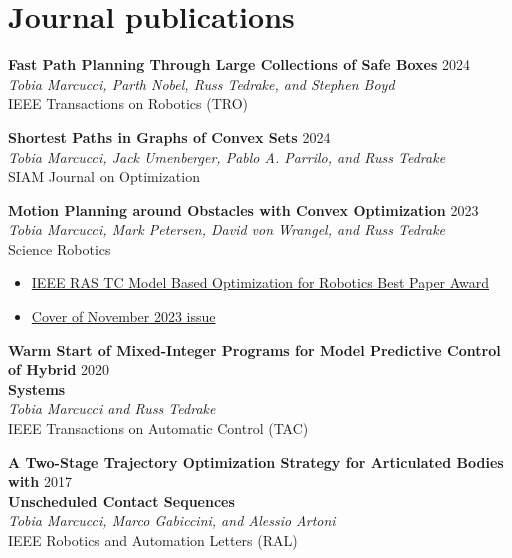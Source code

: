 \documentclass[11pt,a4paper,sans]{moderncv}
\begin{document}
\section{Journal publications}


\begin{enumerate}[label={[J\arabic*]}]
	
\item \textbf{Fast Path Planning Through Large Collections of Safe Boxes} \hfill 2024 \\
\textit{Tobia Marcucci, Parth Nobel, Russ Tedrake, and Stephen Boyd} \\
IEEE Transactions on Robotics (TRO)

\item \textbf{Shortest Paths in Graphs of Convex Sets} \hfill 2024 \\
\textit{Tobia Marcucci, Jack Umenberger, Pablo A. Parrilo, and Russ Tedrake} \\
SIAM Journal on Optimization

\item \textbf{Motion Planning around Obstacles with Convex Optimization} \hfill 2023 \\
\textit{Tobia Marcucci, Mark Petersen, David von Wrangel, and Russ Tedrake} \\
Science Robotics
\begin{itemize}
\item \href{https://www.tcoptrob.org/news/2024-06-12-best-paper/}{\color{cyan}IEEE RAS TC Model Based Optimization for Robotics Best Paper Award}
\item \href{https://www.science.org/toc/scirobotics/8/84}{\color{cyan}Cover of November 2023 issue}
\end{itemize} 

\item \textbf{Warm Start of Mixed-Integer Programs for Model Predictive Control of Hybrid} \hfill 2020 \\ \textbf{Systems}  \\
\textit{Tobia Marcucci and Russ Tedrake} \\
IEEE Transactions on Automatic Control (TAC)

\item \textbf{A Two-Stage Trajectory Optimization Strategy for Articulated Bodies with} \hfill 2017 \\
\textbf{Unscheduled Contact Sequences} \\
\textit{Tobia Marcucci, Marco Gabiccini, and Alessio Artoni} \\
IEEE Robotics and Automation Letters (RAL)

\end{enumerate}
\end{document}
